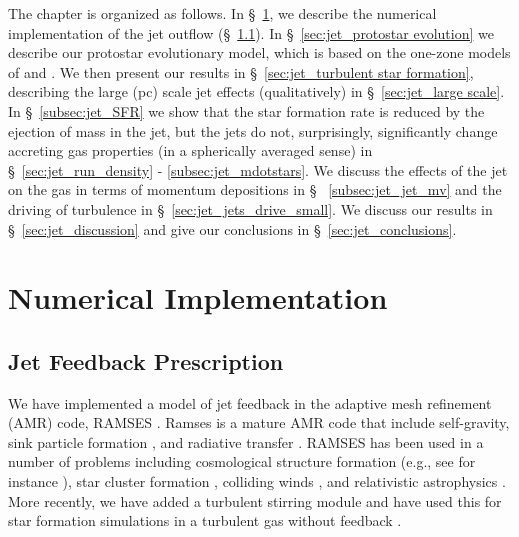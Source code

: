 \documentclass[../dissertation.tex]{subfiles}
\begin{document}
The chapter is organized as follows.
In \S~\ref{sec:jet_implementation}, we describe the numerical implementation of the jet outflow (\S~\ref{sec:jet_jet feedback}).
In \S~\ref{sec:jet_protostar evolution} we describe our protostar evolutionary model, which is based on the one-zone models of \citet{2000ApJ...534..976N} and \citet{2009ApJ...703..131O}.
%
We then present our results in \S~\ref{sec:jet_turbulent star formation}, describing the large (pc) scale jet effects (qualitatively) in \S~\ref{sec:jet_large scale}.
In \S~\ref{subsec:jet_SFR} we show that the star formation rate is reduced by the ejection of mass in the jet, but the jets do not, surprisingly, significantly change accreting gas properties (in a spherically averaged sense) in \S ~\ref{sec:jet_run_density} - \ref{subsec:jet_mdotstars}.
We discuss the effects of the jet on the gas in terms of momentum depositions in  \S~ \ref{subsec:jet_jet_mv} and the driving of turbulence in \S~\ref{sec:jet_jets_drive_small}.
We discuss our results in \S~\ref{sec:jet_discussion} and give our conclusions in \S~\ref{sec:jet_conclusions}.

\section{Numerical Implementation}\label{sec:jet_implementation}

\subsection{Jet Feedback Prescription}\label{sec:jet_jet feedback}

We have implemented a model of jet feedback in the adaptive mesh refinement (AMR) code, RAMSES
 \citep{2002A&A...385..337T}.  Ramses is a mature AMR code that include self-gravity, sink particle formation \citep{2010MNRAS.409..985D,2014MNRAS.445.4015B}, and radiative transfer \citep{2013MNRAS.436.2188R,2015MNRAS.449.4380R}.  RAMSES has been used in a number of problems including cosmological structure formation (e.g., see for instance \citealt{2016MNRAS.463.1462O}), star cluster formation \citep{2017MNRAS.472.4155G}, %
colliding winds \citep{2011MNRAS.418.2618L,2017MNRAS.468.2655L}, and relativistic astrophysics \citep{2013A&A...560A..79L,2018MNRAS.474.2813L}. More recently, we have added a turbulent stirring module and have used this for star formation simulations in a turbulent gas without feedback \citep{2017MNRAS.465.1316M}.
\end{document}

